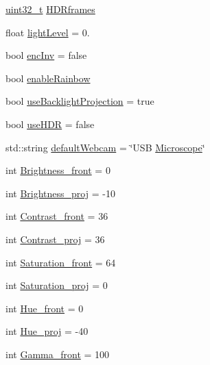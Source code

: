 \begin{DoxyCompactItemize}
\item 
\hyperlink{_soil_math_types_8h_a435d1572bf3f880d55459d9805097f62}{uint32\+\_\+t} \hyperlink{class_soil_analyzer_1_1_soil_settings_a77e631ff44efe74762b5adaa2eb2cd11}{H\+D\+Rframes}
\item 
float \hyperlink{class_soil_analyzer_1_1_soil_settings_aa4d3ed8c1ab6551bfa4763e8a1ffc148}{light\+Level} = 0.
\item 
bool \hyperlink{class_soil_analyzer_1_1_soil_settings_ad831e13b61fc2097219bbf7252f045d5}{enc\+Inv} = false
\item 
bool \hyperlink{class_soil_analyzer_1_1_soil_settings_a9ece0b96eb8614a497fba3a19d8b4da1}{enable\+Rainbow}
\item 
bool \hyperlink{class_soil_analyzer_1_1_soil_settings_a4945fc8b592a2585d3719175e3b80c88}{use\+Backlight\+Projection} = true
\item 
bool \hyperlink{class_soil_analyzer_1_1_soil_settings_a6851d04a1d2a5acbc99c6d9665c40edf}{use\+H\+D\+R} = false
\item 
std\+::string \hyperlink{class_soil_analyzer_1_1_soil_settings_a8dbe6065562599e544b55fb49564fd2d}{default\+Webcam} = \char`\"{}U\+S\+B \hyperlink{class_microscope}{Microscope}\char`\"{}
\item 
int \hyperlink{class_soil_analyzer_1_1_soil_settings_a2989997cfcc00500bba496dd8c8213ce}{Brightness\+\_\+front} = 0
\item 
int \hyperlink{class_soil_analyzer_1_1_soil_settings_a1411d6f8eadfbedd8e23973b11d00c29}{Brightness\+\_\+proj} = -\/10
\item 
int \hyperlink{class_soil_analyzer_1_1_soil_settings_ae4fbf0e9cd99cfa5a4f9cb8aaf0be652}{Contrast\+\_\+front} = 36
\item 
int \hyperlink{class_soil_analyzer_1_1_soil_settings_afb573e7bfd1fb5e3c13b84b91fbb0092}{Contrast\+\_\+proj} = 36
\item 
int \hyperlink{class_soil_analyzer_1_1_soil_settings_aacd4da6bfa26ee6aaec3d57c6653ac09}{Saturation\+\_\+front} = 64
\item 
int \hyperlink{class_soil_analyzer_1_1_soil_settings_a6157c2f85f3249e49617f23343076909}{Saturation\+\_\+proj} = 0
\item 
int \hyperlink{class_soil_analyzer_1_1_soil_settings_a85e56e16b6faa940d4a8f36c9a19d14c}{Hue\+\_\+front} = 0
\item 
int \hyperlink{class_soil_analyzer_1_1_soil_settings_a5267e7cdb6f8bfb18e35cb972b6b7cf3}{Hue\+\_\+proj} = -\/40
\item 
int \hyperlink{class_soil_analyzer_1_1_soil_settings_adee4687a4c0637a04b49d70ad7d45dc4}{Gamma\+\_\+front} = 100

\end{DoxyCompactItemize}
